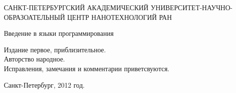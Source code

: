 \begin{titlepage}
\newpage

\begin{center}
САНКТ-ПЕТЕРБУРГСКИЙ АКАДЕМИЧЕСКИЙ УНИВЕРСИТЕТ-НАУЧНО-ОБРАЗОАТЕЛЬНЫЙ ЦЕНТР НАНОТЕХНОЛОГИЙ РАН
\end{center}
\hrulefill


\vspace{8em}

\begin{center}
\Large Введение в языки программирования
\end{center}

\vspace{2.5em}

\begin{flushleft}
Издание первое, приблизительное. \\
Авторство народное. \\
Исправления, замечания и комментарии приветсвуются.
\end{flushleft}

\vspace{\fill}

\begin{center}
Санкт-Петербург, 2012 год.
\end{center}

\end{titlepage}

